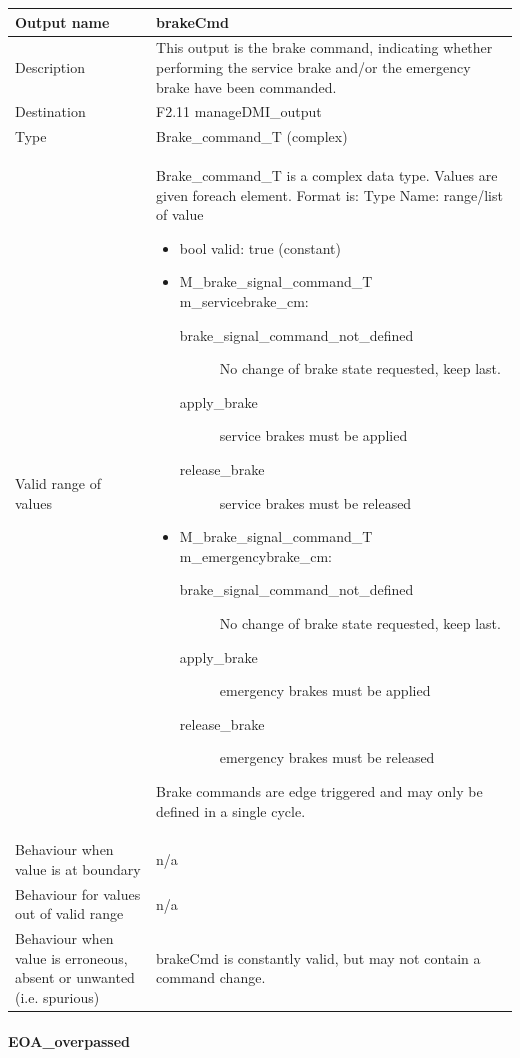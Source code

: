 \begin{longtable}{p{}p{}}
\toprule
Output name				& brakeCmd \\
\midrule
Description				& This output is the brake command, indicating whether performing the service brake and/or the emergency brake have been commanded. \\
\midrule
Destination				& F2.11 manageDMI\_output\\
\midrule
Type					& Brake\_command\_T (complex)\\
\midrule
Valid range of values	& Brake\_command\_T is a complex data type. Values are given foreach element. Format is: Type Name: range/list of value
\begin{itemize}
\item bool valid: true (constant)
\item M\_brake\_signal\_command\_T m\_servicebrake\_cm:
\begin{description}
\item[brake\_signal\_command\_not\_defined] No change of brake state requested, keep last.
\item[apply\_brake] service brakes must be applied
\item[release\_brake] service brakes must be released
\end{description}
\item M\_brake\_signal\_command\_T m\_emergencybrake\_cm:
\begin{description}
\item[brake\_signal\_command\_not\_defined] No change of brake state requested, keep last.
\item[apply\_brake] emergency brakes must be applied
\item[release\_brake] emergency brakes must be released
\end{description}
\end{itemize}
Brake commands are edge triggered and may only be defined in a single cycle. \\
\midrule
Behaviour when value is at boundary	& n/a \\
\midrule
Behaviour for values out of valid range	& n/a \\
\midrule
Behaviour when value is erroneous, absent or unwanted (i.e. spurious) & brakeCmd is constantly valid, but may not contain a command change. \\
\bottomrule
\end{longtable}


\paragraph{EOA\_overpassed}

